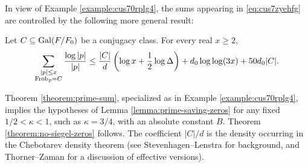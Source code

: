\documentclass[reqno]{amsart} 
\begin{document}
In view of Example \ref{example:cus70rplg4}, the sums appearing in \eqref{eq:cus7zyehfg} are controlled by the following more general result:

\begin{theorem}\label{theorem:prime-sum}
  Let $C\subseteq\operatorname{Gal}(F/F_0)$ be a conjugacy class.  For every real $x\geq2$,
  \begin{equation}\label{eq:cus7jrsd00}
    \sum_{\substack{|p|\leq x\\ \operatorname{Frob}_p=C}} \frac{\log|p|}{|p|} \leq \frac{|C|}{d}\left(\log x+\frac12\log\Delta\right) +d_0\log\log(3x)+50d_0|C|.
  \end{equation}
\end{theorem}
Theorem \ref{theorem:prime-sum}, specialized as in Example \ref{example:cus70rplg4}, implies the hypotheses of Lemma \ref{lemma:prime-saving-zeros} for any fixed $1/2 < \kappa < 1$, such as $\kappa = 3/4$, with an absolute constant $B$.  Theorem \ref{theorem:no-siegel-zeros} follows.  The coefficient \(|C|/d\) is the density occurring in the Chebotarev density theorem (see Stevenhagen--Lenstra \cite{StevenhagenLenstra1996} for background, and Thorner--Zaman \cite[\S1]{ThornerZaman2019} for a discussion of effective versions).
\end{document}
